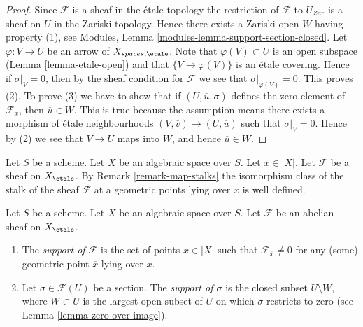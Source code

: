 \begin{proof}
Since $\mathcal{F}$ is a sheaf in the \'etale topology the restriction of
$\mathcal{F}$ to $U_{Zar}$ is a sheaf on $U$ in the Zariski topology.
Hence there exists a Zariski open $W$ having property (1), see
Modules, Lemma \ref{modules-lemma-support-section-closed}. Let
$\varphi : V \to U$ be an arrow of $X_{spaces, \etale}$. Note that
$\varphi(V) \subset U$ is an open subspace
(Lemma \ref{lemma-etale-open})
and that $\{V \to \varphi(V)\}$ is an \'etale covering. Hence if
$\sigma|_V = 0$, then by the sheaf condition for $\mathcal{F}$ we
see that $\sigma|_{\varphi(V)} = 0$. This proves (2).
To prove (3) we have to show that if $(U, \overline{u}, \sigma)$
defines the zero element of $\mathcal{F}_{\overline{x}}$, then
$\overline{u} \in W$. This is true because the assumption means
there exists a morphism of \'etale neighbourhoods
$(V, \overline{v}) \to (U, \overline{u})$ such that
$\sigma|_V = 0$. Hence by (2) we see that $V \to U$ maps into $W$, and
hence $\overline{u} \in W$.
\end{proof}

\noindent
Let $S$ be a scheme.
Let $X$ be an algebraic space over $S$.
Let $x \in |X|$.
Let $\mathcal{F}$ be a sheaf on $X_\etale$. By
Remark \ref{remark-map-stalks}
the isomorphism class of the stalk of the sheaf $\mathcal{F}$
at a geometric points lying over $x$ is well defined.

\begin{definition}
\label{definition-support}
Let $S$ be a scheme.
Let $X$ be an algebraic space over $S$.
Let $\mathcal{F}$ be an abelian sheaf on $X_\etale$.
\begin{enumerate}
\item The {\it support of $\mathcal{F}$} is the set of
points $x \in |X|$ such that $\mathcal{F}_{\overline{x}} \not = 0$
for any (some) geometric point $\overline{x}$ lying over $x$.
\item Let $\sigma \in \mathcal{F}(U)$ be a section.
The {\it support of $\sigma$} is the closed subset $U \setminus W$, where
$W \subset U$ is the largest open subset of $U$ on which $\sigma$
restricts to zero (see
Lemma \ref{lemma-zero-over-image}).
\end{enumerate}
\end{definition}


